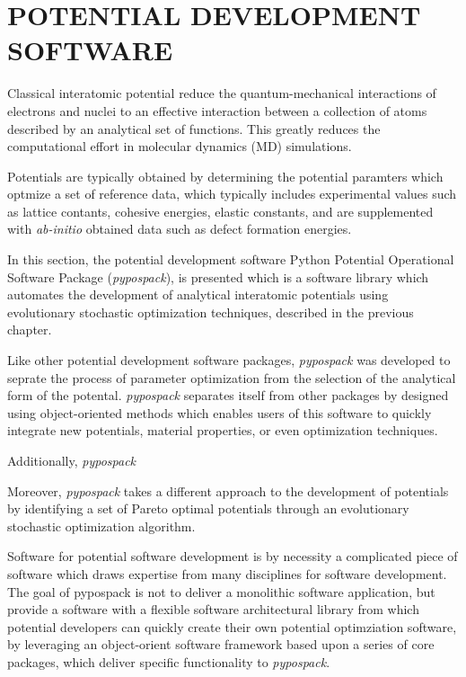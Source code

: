 \chapter{POTENTIAL DEVELOPMENT SOFTWARE}

Classical interatomic potential reduce the quantum-mechanical interactions of electrons and nuclei to an effective interaction between a collection of atoms described by an analytical set of functions.
This greatly reduces the computational effort in molecular dynamics (MD) simulations.

Potentials are typically obtained by determining the potential paramters which optmize a set of reference data, which typically includes experimental values such as lattice contants, cohesive energies, elastic constants, and are supplemented with \emph{ab-initio} obtained data such as defect formation energies.

In this section, the potential development software Python Potential Operational Software Package (\emph{pypospack}), is presented which is a software library which automates the development of analytical interatomic potentials using evolutionary stochastic optimization techniques, described in the previous chapter.

Like other potential development software packages, \emph{pypospack} was developed to seprate the process of parameter optimization from the selection of the analytical form of the potental.  \emph{pypospack} separates itself from other packages by designed using object-oriented methods which enables users of this software to quickly integrate new potentials, material properties, or even optimization techniques.

Additionally, \emph{pypospack}

Moreover, \emph{pypospack} takes a different approach to the development of potentials by identifying a set of Pareto optimal potentials through an evolutionary stochastic optimization algorithm.

Software for potential software development is by necessity a complicated piece of software which draws expertise from many disciplines for software development.  The goal of pypospack is not to deliver a monolithic software application, but provide a software with a flexible software architectural library from which potential developers can quickly create their own potential optimziation software, by leveraging an object-orient software framework based upon a series of core packages, which deliver specific functionality to \emph{pypospack}.

